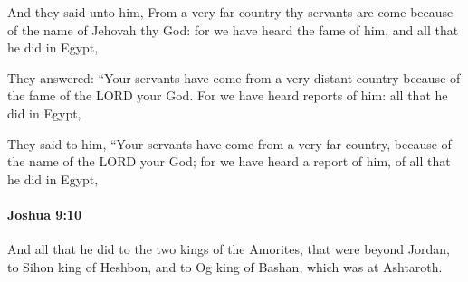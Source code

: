 			\begin{versebox}
					\item[BHS] 
					\item[ASV] And they said unto him, From a very far country thy servants are come because of the name of Jehovah thy God: for we have heard the fame of him, and all that he did in Egypt,
					\item[NIV] They answered: “Your servants have come from a very distant country because of the fame of the LORD your God. For we have heard reports of him: all that he did in Egypt,
					\item[NRSV] They said to him, “Your servants have come from a very far country, because of the name of the LORD your God; for we have heard a report of him, of all that he did in Egypt,
			\end{versebox}

		\paragraph{Joshua 9:10} %
			\label{JOSHUA-9-10}

			And all that he did to the two kings of the Amorites, that were beyond Jordan, to Sihon king of Heshbon, and to Og king of Bashan, which was at Ashtaroth.

